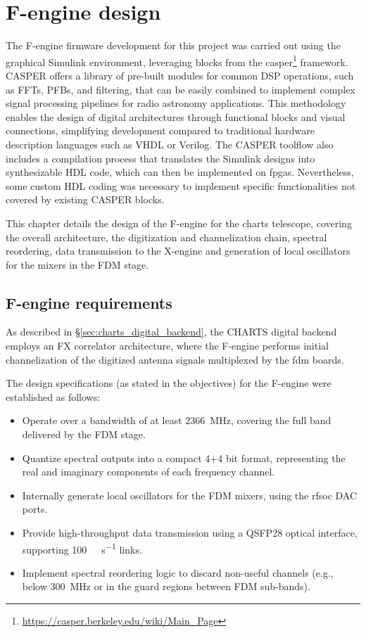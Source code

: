 \chapter{F-engine design}
\label{chap:fengine}

The F-engine firmware development for this project was carried out using the graphical Simulink environment, leveraging blocks from the \gls{casper}\footnote{\url{https://casper.berkeley.edu/wiki/Main_Page}} framework. CASPER offers a library of pre-built modules for common DSP operations, such as FFTs, PFBs, and filtering, that can be easily combined to implement complex signal processing pipelines for radio astronomy applications.  
This methodology enables the design of digital architectures through functional blocks and visual connections, simplifying development compared to traditional hardware description languages such as VHDL or Verilog. The CASPER toolflow also includes a compilation process that translates the Simulink designs into synthesizable HDL code, which can then be implemented on \glspl{fpga}. Nevertheless, some custom HDL coding was necessary to implement specific functionalities not covered by existing CASPER blocks. 

This chapter details the design of the F-engine for the \gls{charts} telescope, covering the overall architecture, the digitization and channelization chain, spectral reordering, data transmission to the X-engine and generation of local oscillators for the mixers in the FDM stage. 

\section{F-engine requirements}
\label{sec:f_engine_architecture}

As described in \S\ref{sec:charts_digital_backend}, the CHARTS digital backend employs an FX correlator architecture, where the F-engine performs initial channelization of the digitized antenna signals multiplexed by the \gls{fdm} boards.  

The design specifications (as stated in the objectives) for the F-engine were established as follows:

\begin{itemize}
    \item Operate over a bandwidth of at least \SI{2366}{\mega\hertz}, covering the full band delivered by the FDM stage.  
    \item Quantize spectral outputs into a compact 4+4 bit format, representing the real and imaginary components of each frequency channel.  
    \item Internally generate local oscillators for the FDM mixers, using the \gls{rfsoc} DAC ports.  
    \item Provide high-throughput data transmission using a QSFP28 optical interface, supporting \SI{100}{\giga\bit\per\second} links.  
    \item Implement spectral reordering logic to discard non-useful channels (e.g., below \SI{300}{\mega\hertz} or in the guard regions between FDM sub-bands).  
\end{itemize}

